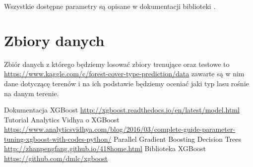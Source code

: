 \documentclass[a4paper,12p]{article}
\begin{document}
Wszystkie dostępne parametry są opisane w dokumentacji biblioteki \cite{github}.

\section{Zbiory danych}
Zbiór danych z którego będziemy losować zbiory trenujące oraz testowe to \url{https://www.kaggle.com/c/forest-cover-type-prediction/data} zawarte są w nim dane dotyczącę terenów i na ich podstawie będziemy oceniać jaki typ lasu rośnie na danym terenie. 



\begin{thebibliography}{1}
 Dokumentacja XGBoost \url{http://xgboost.readthedocs.io/en/latest/model.html}
 Tutorial Analytics Vidhya o XGBoost \url{https://www.analyticsvidhya.com/blog/2016/03/complete-guide-parameter-tuning-xgboost-with-codes-python/}
 Parallel Gradient Boosting Decision Trees \url{http://zhanpengfang.github.io/418home.html}
 Biblioteka XGBoost \url{https://github.com/dmlc/xgboost}
\end{thebibliography}
\end{document}
